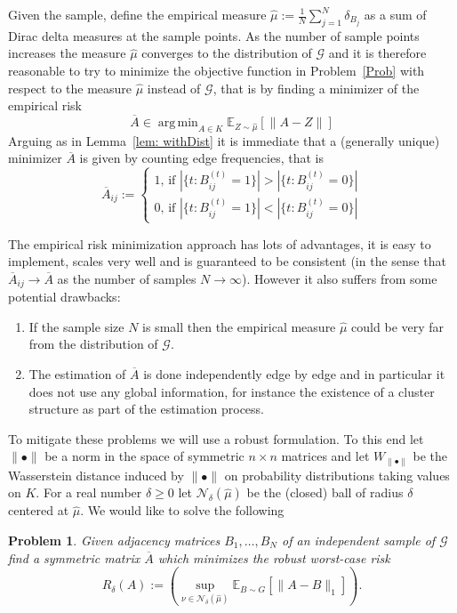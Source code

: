 \documentclass[12pt]{amsart}
\newtheorem*{problem*}{Problem}
\theoremstyle{remark}
\DeclareMathOperator*{\argmin}{arg\,min}
\newcommand{\EE}{\mathbb{E}}
\newcommand{\grG}{{\mathcal{G}}}
\begin{document}
Given the sample, define the empirical measure $\hat{\mu}:=\frac{1}{N}\sum_{j=1}^N \delta_{B_j}$ as a sum of Dirac delta measures at the sample points. As the number of sample points increases the measure $\hat{\mu}$ converges to the distribution of $\grG$ and it is therefore reasonable to try to minimize the objective function in Problem~\ref{Prob} with respect to the measure $\hat{\mu}$ instead of $\grG$, that is by finding a minimizer of the empirical risk
\[\overline{A}\in\argmin _{A\in K} \EE_{Z\sim \hat{\mu}}[\|A-Z\|]\]
Arguing as in Lemma~\ref{lem: withDist} it is immediate that a (generally unique) minimizer $\overline{A}$ is given by counting edge frequencies, that is
\[ 
\overline{A}_{ij}:=\begin{cases}
1\text{, if $|\{t: B^{(t)}_{ij}=1\}|>|\{t: B^{(t)}_{ij}=0\}|$}\\
0\text{, if $|\{t: B^{(t)}_{ij}=1\}|<|\{t: B^{(t)}_{ij}=0\}|$}
\end{cases}
\]

The empirical risk minimization approach has lots of advantages, it is easy to implement, scales very well and is guaranteed to be consistent (in the sense that $\overline{A}_{ij}\rightarrow \overline{A}$ as the number of samples $N\rightarrow \infty$). However it also suffers from some potential drawbacks:

\begin{enumerate}
\item If the sample size $N$ is small then the empirical measure $\hat\mu$ could be very far from the distribution of $\grG$.
\item The estimation of $\overline{A}$ is done independently edge by edge and in particular it does not use any global information, for instance the existence of a cluster structure as part of the estimation process.
\end{enumerate}

To mitigate these problems we will use a robust formulation. To this end let $\|\bullet\|$ be a norm in the space of symmetric $n\times n$ matrices and let $W_{\|\bullet\|}$ be the Wasserstein distance induced by $\|\bullet\|$ on probability distributions taking values on $K$. For a real number $\delta\geq 0$ let $\mathcal{N}_{\delta}(\hat{\mu})$ be the (closed) ball of radius $\delta$ centered at $\hat{\mu}$. We would like to solve the following


\begin{problem*}\label{ProbRobusto} Given adjacency matrices $B_1,\dots, B_N$ of an independent sample of $\grG$ find a symmetric matrix $\overline{A}$ which minimizes the robust worst-case risk 
\[R_{\delta}(A):=\left(\sup_{\nu\in \mathcal{N}_{\delta}(\hat{\mu})} \EE_{B\sim G}[\|A-B\|_1]\right).\] 
\end{problem*}
\end{document}
